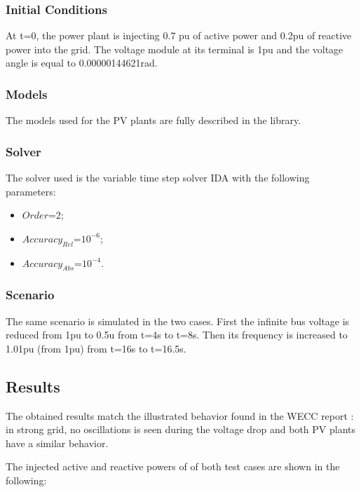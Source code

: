 \documentclass[a4paper, 12pt]{report}
\begin{document}
\subsubsection{Initial Conditions}

\par At t=0, the power plant is injecting 0.7 pu of active power and 0.2pu of reactive power into the grid. The voltage module at its terminal is 1pu and the voltage angle is equal to 0.00000144621rad.

\subsubsection{Models}

\par The models used for the PV plants are fully described in the \Dynawo library.

\subsubsection{Solver}

\par The solver used is the variable time step solver IDA with the following parameters:
\begin{itemize}
\item $Order$=2;
\item $Accuracy_{Rel}$=$10^{-6}$;
\item $Accuracy_{Abs}$=$10^{-4}$.
\end{itemize}

\subsubsection{Scenario}

\par The same scenario is simulated in the two cases. First the infinite bus voltage is reduced from 1pu to 0.5u from t=4s to t=8s. Then its frequency is increased to 1.01pu (from 1pu) from t=16s to t=16.5s.

\subsection{Results}

\par The obtained results match the illustrated behavior found in the WECC report : in strong grid, no oscillations is seen during the voltage drop and both PV plants have a similar behavior.
\par The injected active and reactive powers of of both test cases are shown in the following:
\end{document}
